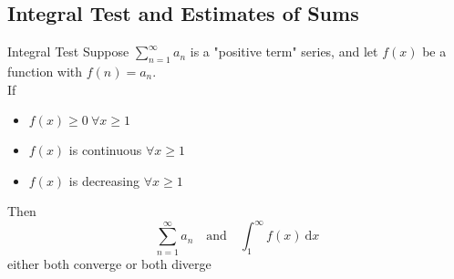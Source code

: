 \documentclass[12pt,a4paper]{article}
\def\d{{\mathrm{d}}}
\def\dx{\d x}
\begin{document}
\subsection{Integral Test and Estimates of Sums}
\begin{thm}{Integral Test}
	Suppose $\displaystyle\sum_{n=1}^{\infty}a_n$ is a "positive term" series, and let $f(x)$ be a function with $f(n)=a_n.$\\
	If
	\begin{itemize}
		\item $f(x)\geq0\ \forall x\geq1$
		\item $f(x)$ is continuous $\forall x\geq1$
		\item $f(x)$ is decreasing $\forall x\geq1$
	\end{itemize}
	Then $$\sum_{n=1}^{\infty}a_n\quad\text{and}\quad\int_1^\infty f(x)\ \dx$$ either both converge or both diverge
\end{thm}
\end{document}
